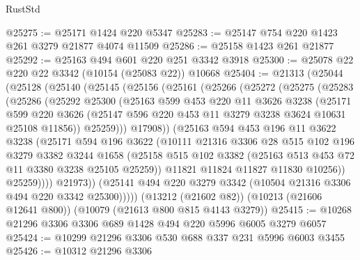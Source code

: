 \begin{lexlean}{RustStd}
\begin{coremodule}
{\begin{coremodule}
{{{{{{{{{{{{{{{{{{{{{{{{{{@25275 := @25171 @1424 @220 @5347
@25283 := @25147 @754 @220 @1423 @261 @3279 @21877 @4074 @11509
@25286 := @25158 @1423 @261 @21877
@25292 := @25163 @494 @601 @220 @251 @3342 @3918
@25300 := @25078 @22 @220 @22 @3342 (@10154 (@25083 @22)) @10668
@25404 := @21313
    (@25044
      (@25128
        (@25140
          (@25145
            (@25156
              (@25161
                (@25266
                  (@25272
                    (@25275
                      (@25283
                        (@25286
                          (@25292
                            @25300
                            (@25163
                              @599
                              @453
                              @220
                              @11
                              @3626
                              @3238
                              (@25171
                                @599
                                @220
                                @3626
                                (@25147 @596 @220 @453 @11 @3279 @3238 @3624 @10631 @25108 @11856))
                              @25259)))
                        @17908))
                    (@25163
                      @594
                      @453
                      @196
                      @11
                      @3622
                      @3238
                      (@25171
                        @594
                        @196
                        @3622
                        (@10111
                          @21316
                          @3306
                          @28
                          @515
                          @102
                          @196
                          @3279
                          @3382
                          @3244
                          @1658
                          (@25158
                            @515
                            @102
                            @3382
                            (@25163 @513 @453 @72 @11 @3380 @3238 @25105 @25259))
                          @11821
                          @11824
                          @11827
                          @11830
                          @10256))
                      @25259))))
              @21973))
          (@25141 @494 @220 @3279 @3342 (@10504 @21316 @3306 @494 @220 @3342 @25300)))))
    (@13212 (@21602 @82))
    (@10213 (@21606 @12641 @800))
    (@10079 (@21613 @800 @815 @4143 @3279))
@25415 := @10268 @21296 @3306 @3306 @689 @1428 @494 @220 @5996 @6005 @3279 @6057
@25424 := @10299 @21296 @3306 @530 @688 @337 @231 @5996 @6003 @3455
@25426 := @10312 @21296 @3306
}}}}}}}}}}}}}}}}}}}}}}}}}}
\end{coremodule}}
\end{coremodule}
\end{lexlean}
